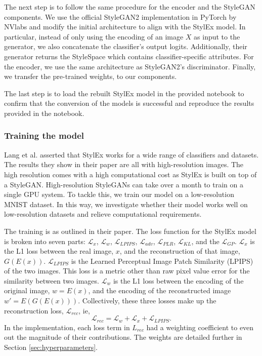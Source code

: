 The next step is to follow the same procedure for the encoder and the StyleGAN components. We use the official StyleGAN2 implementation in PyTorch by NVlabs\cite{Karras2020AnalyzingAI} and modify the initial architecture to align with the StylEx model. In particular, instead of only using the encoding of an image $X$ as input to the generator, we also concatenate the classifier's output logits. Additionally, their generator returns the StyleSpace which contains classifier-specific attributes. For the encoder, we use the same architecture as StyleGAN2's discriminator. Finally, we transfer the pre-trained weights, to our components.

The last step is to load the rebuilt StylEx model in the provided notebook to confirm that the conversion of the models is successful and reproduce the results provided in the notebook. 

\subsubsection{Training the model}

Lang et al. asserted that StylEx works for a wide range of classifiers and datasets. The results they show in their paper are all with high-resolution images. The high resolution comes with a high computational cost as StylEx is built on top of a StyleGAN. High-resolution StyleGANs can take over a month to train on a single GPU system. To tackle this, we train our model on a low-resolution MNIST dataset. In this way, we investigate whether their model works well on low-resolution datasets and relieve computational requirements.

The training is as outlined in their paper. The loss function for the StylEx model is broken into seven parts: $\mathcal{L}_x$, $\mathcal{L}_w$, $\mathcal{L}_{LPIPS}$, $\mathcal{L}_{adv}$, $\mathcal{L}_{PLR}$, $\mathcal{L}_{KL}$, and the $\mathcal{L}_{GP}$. $\mathcal{L}_x$ is the L1 loss between the real image, $x$, and the reconstruction of that image, $G(E(x))$. $\mathcal{L}_{LPIPS}$ is the Learned Perceptual Image Patch Similarity (LPIPS) of the two images. This loss is a metric other than raw pixel value error for the similarity between two images. $\mathcal{L}_w$ is the L1 loss between the encoding of the original image, $w = E(x)$, and the encoding of the reconstructed image $w' = E(G(E(x)))$. Collectively, these three losses make up the reconstruction loss, $\mathcal{L}_{rec}$, ie, $$\mathcal{L}_{rec} = \mathcal{L}_w +\mathcal{L}_x + \mathcal{L}_{LPIPS}.$$
In the implementation, each loss term in $L_{rec}$ had a weighting coefficient to even out the magnitude of their contributions. The weights are detailed further in Section \ref{sec:hyperparameters}.


